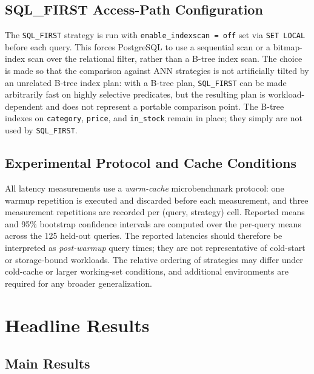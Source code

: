 \documentclass[conference]{IEEEtran}
\begin{document}
\subsection{SQL\_FIRST Access-Path Configuration}
\label{sec:sql-first-cfg}

The \texttt{SQL\_FIRST} strategy is run with
\texttt{enable\_indexscan = off} set via \texttt{SET LOCAL} before each
query. This forces PostgreSQL to use a sequential scan or a bitmap-index
scan over the relational filter, rather than a B-tree index scan. The
choice is made so that the comparison against ANN strategies is not
artificially tilted by an unrelated B-tree index plan: with a B-tree
plan, \texttt{SQL\_FIRST} can be made arbitrarily fast on highly
selective predicates, but the resulting plan is workload-dependent and
does not represent a portable comparison point. The B-tree indexes on
\texttt{category}, \texttt{price}, and \texttt{in\_stock} remain in place;
they simply are not used by \texttt{SQL\_FIRST}.

\subsection{Experimental Protocol and Cache Conditions}
\label{sec:protocol}

All latency measurements use a \emph{warm-cache} microbenchmark protocol:
one warmup repetition is executed and discarded before each measurement,
and three measurement repetitions are recorded per
(query, strategy) cell. Reported means and 95\% bootstrap confidence
intervals are computed over the per-query means across the 125 held-out
queries. The reported latencies should therefore be interpreted as
\emph{post-warmup} query times; they are not representative of
cold-start or storage-bound workloads. The relative ordering of
strategies may differ under cold-cache or larger working-set conditions,
and additional environments are required for any broader generalization.

\section{Headline Results}
\label{sec:results}

\subsection{Main Results}
\label{sec:results-main}
\end{document}
